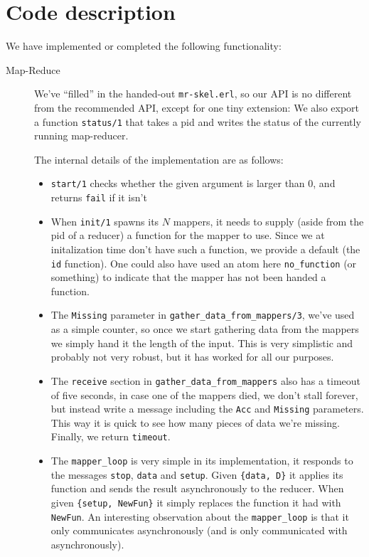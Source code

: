 \documentclass[a4paper]{article}
\begin{document}
\section*{Code description}
We have implemented or completed the following functionality:
\begin{description}
\item[Map-Reduce] We've ``filled'' in the handed-out \texttt{mr-skel.erl}, so our API is no different from the recommended API, except for one tiny extension: We also export a function \texttt{status/1} that takes a pid and writes the status of the currently running map-reducer.
  
  The internal details of the implementation are as follows:
  \begin{itemize}
  \item \texttt{start/1} checks whether the given argument is larger than $0$, and returns \texttt{fail} if it isn't
  \item When \texttt{init/1} spawns its $N$ mappers, it needs to supply (aside from the pid of a reducer) a function for the mapper to use. Since we at initalization time don't have such a function, we provide a default (the \texttt{id} function). One could also have used an atom here \texttt{no\_function} (or something) to indicate that the mapper has not been handed a function.
  \item The \texttt{Missing} parameter in \texttt{gather\_data\_from\_mappers/3}, we've used as a simple counter, so once we start gathering data from the mappers we simply hand it the length of the input. This is very simplistic and probably not very robust, but it has worked for all our purposes.
  \item The \texttt{receive} section in \texttt{gather\_data\_from\_mappers} also has a timeout of five seconds, in case one of the mappers died, we don't stall forever, but instead write a message including the \texttt{Acc} and \texttt{Missing} parameters. This way it is quick to see how many pieces of data we're missing. Finally, we return \texttt{timeout}.
   \item The \texttt{mapper\_loop} is very simple in its implementation, it responds to the messages \texttt{stop}, \texttt{data} and \texttt{setup}. Given \texttt{\{data, D\}} it applies its function and sends the result asynchronously to the reducer. When given \texttt{\{setup, NewFun\}} it simply replaces the function it had with \texttt{NewFun}. An interesting observation about the \texttt{mapper\_loop} is that it only communicates asynchronously (and is only communicated with asynchronously).

\end{itemize}
\end{description}
\end{document}
